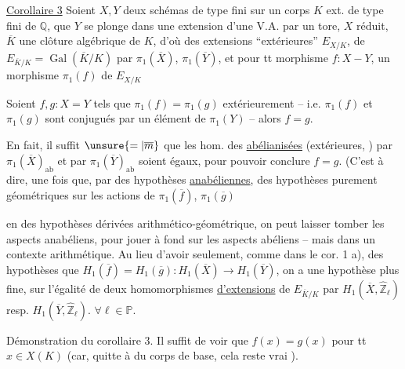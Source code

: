 \uline{Corollaire 3} Soient  $X,Y$ deux schémas de type fini sur un corps $K$ ext. de type fini de $\mathbb Q$,   que $Y$ se plonge dans une  extension d'une V.A. par un tore, $X$ réduit,   $\overline K$ une clôture algébrique de $K$, d'où des extensions ``extérieures'' $E_{X/K}$,  de $E_{\overline K/K}=\operatorname{Gal}(\overline K/K)$ par $\pi_1(\overline X)$, $\pi_1(\overline Y)$, et pour tt morphisme $f:X-Y$, un morphisme $\pi_1(f)$ de $E_{X/K}$ 

Soient $f,g:X=Y$ tels que $\pi_1(f)=\pi_1(g)$ extérieurement -- i.e. $\pi_1(f)$ et $\pi_1(g)$ sont conjugués par un élément de $\pi_1(Y)$ -- alors $f=g$.

En fait, il suffit $\unsure{=|\overline m}$ que les hom. des \uline{abélianisées} (extérieures, ) par $\pi_1(\overline X)_{\mathrm{ab}}$ et par $\pi_1(\overline Y)_{\mathrm{ab}}$ soient égaux, pour pouvoir conclure $f=g$. (C'est à dire, une fois que,  par des hypothèses \uline{anabéliennes}, des hypothèses purement géométriques sur les actions de $\pi_1(\overline f)$, $\pi_1(\overline g)$ 

 en des hypothèses dérivées  arithmético-géométrique, on peut laisser tomber les aspects anabéliens, pour jouer à fond sur les aspects abéliens -- mais dans un contexte arithmétique. Au lieu d'avoir  seulement, comme dans le cor. 1 a), des hypothèses que $H_1(\overline f)=H_1(\overline g):H_1(\overline X)\longrightarrow H_1(\overline Y)$, on a une hypothèse plus fine, sur l'égalité de deux homomorphismes \uline{d'extensions} de $E_{\overline K/K}$ par $H_1(\overline X,\widehat{\mathbb Z}_\ell)$ resp. $H_1(\overline Y,\widehat{\mathbb Z}_\ell)$. $\forall\ell\in\mathbb P$.

Démonstration du corollaire 3.
Il suffit de voir que $f(x)=g(x)$ pour tt $x\in X(K)$ (car, quitte à   du corps de base, cela reste vrai  ). 

